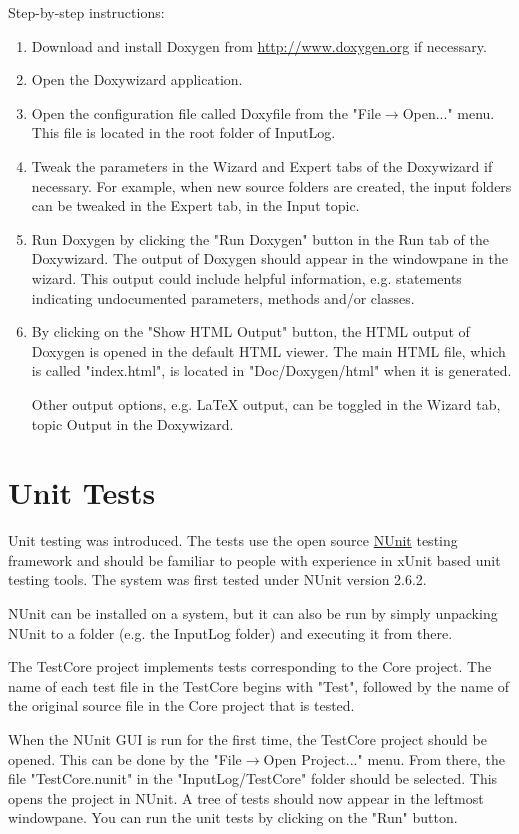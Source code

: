\documentclass[a4paper,11pt]{report}
\begin{document}
	Step-by-step instructions:
	\begin{enumerate}
		\item Download and install Doxygen from \url{http://www.doxygen.org} if necessary.
		\item Open the Doxywizard application.
		\item Open the configuration file called Doxyfile from the "File$\rightarrow$Open..." menu. This file is located in the root folder of InputLog.
		\item Tweak the parameters in the Wizard and Expert tabs of the Doxywizard if necessary. For example, when new source folders are created, the input folders can be tweaked in the Expert tab, in the Input topic.
		\item Run Doxygen by clicking the "Run Doxygen" button in the Run tab of the Doxywizard. The output of Doxygen should appear in the windowpane in the wizard. This output could include helpful information, e.g. statements indicating undocumented parameters, methods and/or classes.
		\item By clicking on the "Show HTML Output" button, the HTML output of Doxygen is opened in the default HTML viewer. The main HTML file, which is called "index.html", is located in "Doc/Doxygen/html" when it is generated.
		
		Other output options, e.g. \LaTeX{} output, can be toggled in the Wizard tab, topic Output in the Doxywizard.
	\end{enumerate}
	

\section{Unit Tests}
	Unit testing was introduced. The tests use the open source \href{http://www.nunit.org/}{NUnit} testing framework and should be familiar to people with experience in xUnit based unit testing tools.
	The system was first tested under NUnit version 2.6.2.
	
	NUnit can be installed on a system, but it can also be run by simply unpacking NUnit to a folder (e.g. the InputLog folder) and executing it from there.
	
	
	
	The TestCore project implements tests corresponding to the Core project. The name of each test file in the TestCore begins with "Test", followed by the name of the original source file in the Core project that is tested.
	
	When the NUnit GUI is run for the first time, the TestCore project should be opened. This can be done by the "File$\rightarrow$Open Project..." menu. From there, the file "TestCore.nunit" in the "InputLog/TestCore" folder should be selected. This opens the project in NUnit. A tree of tests should now appear in the leftmost windowpane. You can run the unit tests by clicking on the "Run" button.
	
\end{document}
